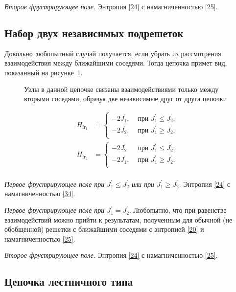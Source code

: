 \emph{Второе фрустрирующее поле}. Энтропия \eqref{24} с намагниченностью \eqref{25}.

\subsection{Набор двух независимых подрешеток}

Довольно любопытный случай получается, если убрать из рассмотрения взаимодействия между ближайшими соседями. Тогда цепочка примет вид, показанный на рисунке~\ref{twoChains}.

 \begin{figure}[h]
 	\caption{Узлы в данной цепочке связаны взаимодействиями только между вторыми соседями, образуя две независимые друг от друга цепочки}
 	\label{twoChains}
 \end{figure}

\[
\begin{aligned}
H_{\text{fr}_1}&=
\begin{cases}
-2J_{1}^{'}, & \text{ при } J_{1}^{'}\leq J_{2}^{'}; \\
-2J_{2}^{'}, & \text{ при } J_{1}^{'}\ge J_{2}^{'}; \\
\end{cases}\\
H_{\text{fr}_2}&=
\begin{cases}
-2J_{2}^{'}, & \text{ при } J_{1}^{'}\leq J_{2}^{'}; \\
-2J_{1}^{'}, & \text{ при } J_{1}^{'}\ge J_{2}^{'}; \\
\end{cases}\\
\end{aligned}
\]

\emph{Первое фрустрирующее поле при $J_{1}^{'}\leq J_{2}^{'}$ или при $J_{1}^{'}\ge J_{2}^{'}$}. Энтропия \eqref{24} с намагниченностью \eqref{34}.

\emph{Первое фрустрирующее поле при $J_{1}^{'} = J_{2}^{'}$}.
Любопытно, что при равенстве взаимодействий можно прийти к результатам, полученным для обычной (не обобщенной) решетки с ближайшими соседями с энтропией \eqref{20} и намагниченностью \eqref{25}.

\emph{Второе фрустрирующее поле}. Энтропия \eqref{24} с намагниченностью \eqref{25}.

\subsection{Цепочка лестничного типа}

